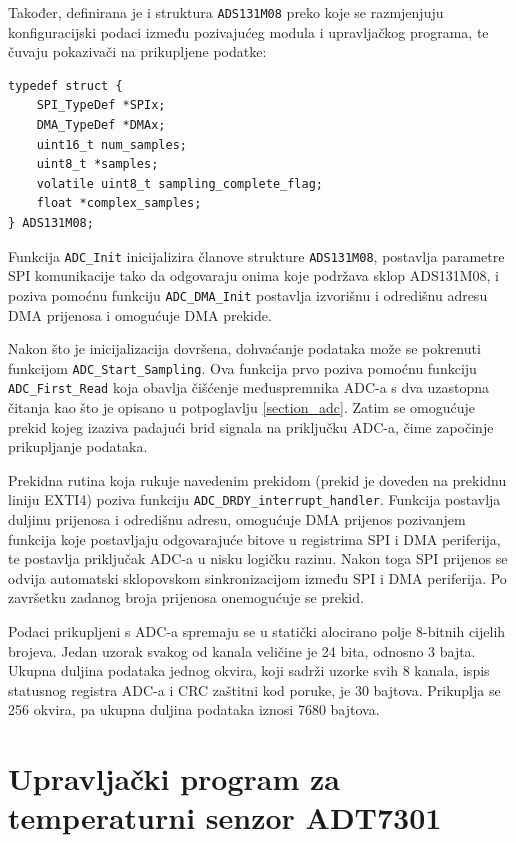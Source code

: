 Također, definirana je i struktura \texttt{ADS131M08} preko koje se razmjenjuju konfiguracijski podaci između pozivajućeg modula i upravljačkog programa, te čuvaju pokazivači na prikupljene podatke:

\begin{lstlisting}
typedef struct {
    SPI_TypeDef *SPIx;
    DMA_TypeDef *DMAx;
    uint16_t num_samples;
    uint8_t *samples;
    volatile uint8_t sampling_complete_flag;
    float *complex_samples;
} ADS131M08;
\end{lstlisting}

Funkcija \texttt{ADC\_Init} inicijalizira članove strukture \texttt{ADS131M08}, postavlja parametre SPI komunikacije tako da odgovaraju onima koje podržava sklop ADS131M08, i poziva pomoćnu funkciju \texttt{ADC\_DMA\_Init} postavlja izvorišnu i odredišnu adresu DMA prijenosa i omogućuje DMA prekide.

Nakon što je inicijalizacija dovršena, dohvaćanje podataka može se pokrenuti funkcijom \texttt{ADC\_Start\_Sampling}. Ova funkcija prvo poziva pomoćnu funkciju \texttt{ADC\_First\_Read} koja obavlja čišćenje međuspremnika ADC-a s dva uzastopna čitanja kao što je opisano u potpoglavlju \ref{section_adc}. Zatim se omogućuje prekid kojeg izaziva padajući brid signala na  priključku ADC-a, čime započinje prikupljanje podataka.

Prekidna rutina koja rukuje navedenim prekidom (prekid je doveden na prekidnu liniju EXTI4) poziva funkciju \texttt{ADC\_DRDY\_interrupt\_handler}. Funkcija postavlja duljinu prijenosa i odredišnu adresu, omogućuje DMA prijenos pozivanjem funkcija koje postavljaju odgovarajuće bitove u registrima SPI i DMA periferija, te postavlja  priključak ADC-a u nisku logičku razinu. Nakon toga SPI prijenos se odvija automatski sklopovskom sinkronizacijom između SPI i DMA periferija. Po završetku zadanog broja prijenosa onemogućuje se  prekid.

Podaci prikupljeni s ADC-a spremaju se u statički alocirano polje 8-bitnih cijelih brojeva. Jedan uzorak svakog od kanala veličine je 24 bita, odnosno 3 bajta. Ukupna duljina podataka jednog okvira, koji sadrži uzorke svih 8 kanala, ispis statusnog registra ADC-a i CRC zaštitni kod poruke, je 30 bajtova. Prikuplja se 256 okvira, pa ukupna duljina podataka iznosi 7680 bajtova.

\section{Upravljački program za temperaturni senzor ADT7301}

